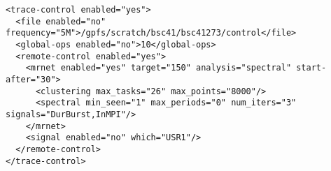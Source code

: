 \begin{verbatim}
<trace-control enabled="yes">
  <file enabled="no" frequency="5M">/gpfs/scratch/bsc41/bsc41273/control</file>
  <global-ops enabled="no">10</global-ops>
  <remote-control enabled="yes">
    <mrnet enabled="yes" target="150" analysis="spectral" start-after="30">
      <clustering max_tasks="26" max_points="8000"/>
      <spectral min_seen="1" max_periods="0" num_iters="3" signals="DurBurst,InMPI"/>
    </mrnet>
    <signal enabled="no" which="USR1"/>
  </remote-control>
</trace-control> 
\end{verbatim}
